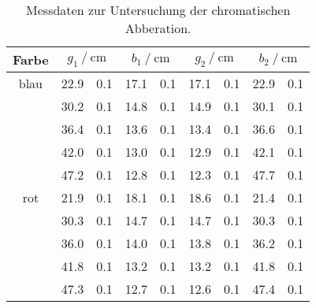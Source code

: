 \begin{table} 
\centering 
\caption{Messdaten zur Untersuchung der chromatischen Abberation.} 
\label{tab: colors} 
\begin{tabular}{S S[table-format=2.1]@{${}\pm{}$} S[table-format=1.1]
S[table-format=2.1]@{${}\pm{}$} S[table-format=1.1]
S[table-format=2.1]@{${}\pm{}$} S[table-format=1.1]
S[table-format=2.1]@{${}\pm{}$} S[table-format=1.1]}  
\toprule  
{Farbe} &  &  & &   \\ 
\midrule  
 blau  & 22.9  & 0.1  & 17.1  & 0.1  & 17.1  & 0.1  & 22.9  & 0.1\\ 
  & 30.2  & 0.1  & 14.8  & 0.1  & 14.9  & 0.1  & 30.1  & 0.1\\ 
  & 36.4  & 0.1  & 13.6  & 0.1  & 13.4  & 0.1  & 36.6  & 0.1\\ 
  & 42.0  & 0.1  & 13.0  & 0.1  & 12.9  & 0.1  & 42.1  & 0.1\\ 
  & 47.2  & 0.1  & 12.8  & 0.1  & 12.3  & 0.1  & 47.7  & 0.1\\ 
\hline
rot  & 21.9  & 0.1  & 18.1  & 0.1  & 18.6  & 0.1  & 21.4  & 0.1\\ 
  & 30.3  & 0.1  & 14.7  & 0.1  & 14.7  & 0.1  & 30.3  & 0.1\\ 
  & 36.0  & 0.1  & 14.0  & 0.1  & 13.8  & 0.1  & 36.2  & 0.1\\ 
  & 41.8  & 0.1  & 13.2  & 0.1  & 13.2  & 0.1  & 41.8  & 0.1\\ 
  & 47.3  & 0.1  & 12.7  & 0.1  & 12.6  & 0.1  & 47.4  & 0.1\\ 
\bottomrule 
\end{tabular} 
\end{table}
